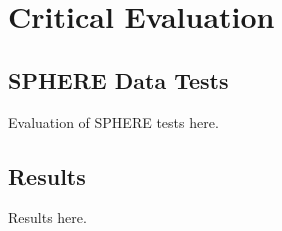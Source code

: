 \chapter{Critical Evaluation}
\label{chap:evaluation}
%
%
%

\section{SPHERE Data Tests}
Evaluation of SPHERE tests here.

\section{Results}
Results here.
